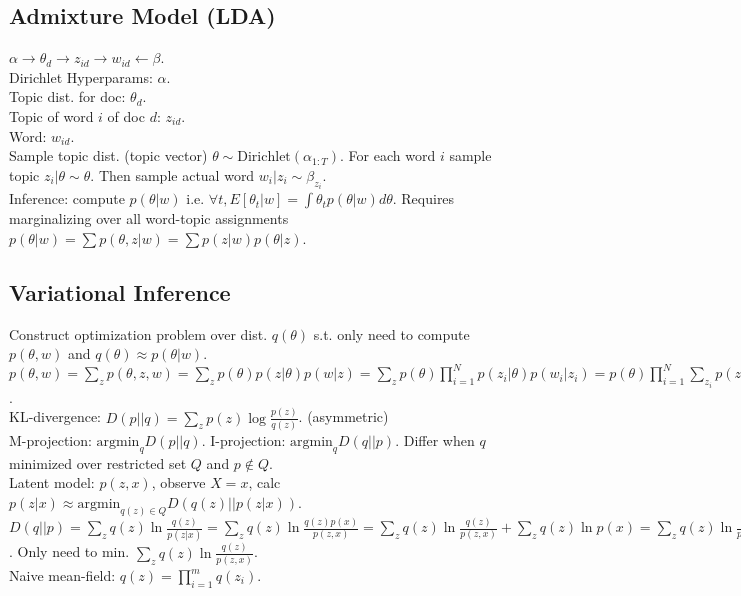 \subsection*{Admixture Model (LDA)}

$\alpha \rightarrow \theta_d \rightarrow z_{id} \rightarrow w_{id} \leftarrow \beta$.\\
Dirichlet Hyperparams: $\alpha$.\\
Topic dist. for doc: $\theta_d$.\\
Topic of word $i$ of doc $d$: $z_{id}$.\\
Word: $w_{id}$.\\
Sample topic dist. (topic vector) $\theta \sim \text{Dirichlet}(\alpha_{1:T})$. For each word $i$ sample topic $z_i | \theta \sim \theta$. Then sample actual word $w_i | z_i \sim \beta_{z_i}$.\\
Inference: compute $p(\theta|w)$ i.e. $\forall t, E[\theta_t | w] = \int \theta_t p(\theta|w) d\theta$. Requires marginalizing over all word-topic assignments $p(\theta|w) = \sum p(\theta,z|w) = \sum p(z|w)p(\theta|z)$.\\

\subsection*{Variational Inference}

Construct optimization problem over dist. $q(\theta)$ s.t. only need to compute $p(\theta, w)$ and $q(\theta) \approx p(\theta|w)$.\\
$p(\theta, w) = \sum_z p(\theta,z,w) = \sum_z p(\theta) p(z|\theta) p(w|z) = \sum_z p(\theta) \prod_{i=1}^N p(z_i|\theta) p(w_i|z_i) = p(\theta) \prod_{i=1}^N \sum_{z_i} p(z_i|\theta) p(w_i|z_i)$.\\
KL-divergence: $D(p||q) = \sum_z p(z)\log\frac{p(z)}{q(z)}$. (asymmetric)\\
M-projection: $\text{argmin}_q D(p||q)$. I-projection: $\text{argmin}_q D(q||p)$. Differ when $q$ minimized over restricted set $Q$ and $p\not\in Q$.\\
Latent model: $p(z, x)$, observe $X=x$, calc $p(z|x) \approx \text{argmin}_{q(z) \in Q} D(q(z)||p(z|x))$.\\
$D(q||p) = \sum_z q(z)\ln \frac{q(z)}{p(z|x)} = \sum_z q(z)\ln\frac{q(z)p(x)}{p(z,x)} = \sum_z q(z)\ln\frac{q(z)}{p(z,x)}+\sum_z q(z)\ln p(x) = \sum_z q(z)\ln\frac{q(z)}{p(z,x)}+\ln p(x)$. Only need to min. $\sum_z q(z)\ln\frac{q(z)}{p(z,x)}$.\\
Naive mean-field: $q(z) = \prod_{i=1}^m q(z_i)$.\\


